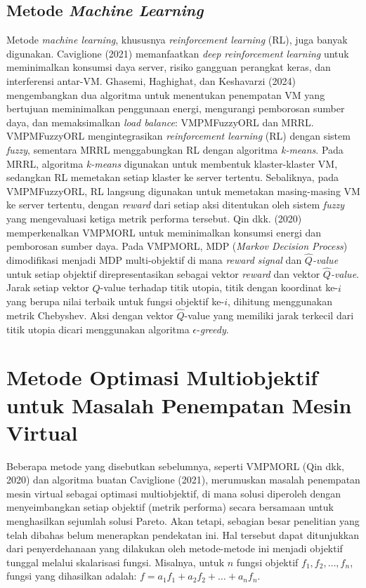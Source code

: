 \subsection{Metode \textit{Machine Learning}}
Metode \textit{machine learning}, khususnya \textit{reinforcement learning} (RL), juga banyak digunakan. Caviglione (2021) memanfaatkan \textit{deep reinforcement learning} untuk meminimalkan konsumsi daya server, risiko gangguan perangkat keras, dan interferensi antar-VM. Ghasemi, Haghighat, dan Keshavarzi (2024) mengembangkan dua algoritma untuk menentukan penempatan VM yang bertujuan meminimalkan penggunaan energi, mengurangi pemborosan sumber daya, dan memaksimalkan \textit{load balance}: VMPMFuzzyORL dan MRRL. VMPMFuzzyORL mengintegrasikan \textit{reinforcement learning} (RL) dengan sistem \textit{fuzzy}, sementara MRRL menggabungkan RL dengan algoritma \textit{k-means}. Pada MRRL, algoritma \textit{k-means} digunakan untuk membentuk klaster-klaster VM, sedangkan RL memetakan setiap klaster ke server tertentu. Sebaliknya, pada VMPMFuzzyORL, RL langsung digunakan untuk memetakan masing-masing VM ke server tertentu, dengan \textit{reward} dari setiap aksi ditentukan oleh sistem \textit{fuzzy} yang mengevaluasi ketiga metrik performa tersebut. Qin dkk. (2020) memperkenalkan VMPMORL untuk meminimalkan konsumsi energi dan pemborosan sumber daya. Pada VMPMORL, MDP (\textit{Markov Decision Process}) dimodifikasi menjadi MDP multi-objektif di mana \textit{reward signal} dan \textit{$\widehat{Q}$-value} untuk setiap objektif direpresentasikan sebagai vektor \textit{reward} dan vektor \textit{$\widehat{Q}$-value}. Jarak setiap vektor $\widehat{Q}$-value terhadap titik utopia, titik dengan koordinat ke-$i$ yang berupa nilai terbaik untuk fungsi objektif ke-$i$, dihitung menggunakan metrik Chebyshev. Aksi dengan vektor $\widehat{Q}$-value yang memiliki jarak terkecil dari titik utopia dicari menggunakan algoritma $\epsilon$-\textit{greedy}. 

\section{Metode Optimasi Multiobjektif untuk Masalah Penempatan Mesin Virtual}
Beberapa metode yang disebutkan sebelumnya, seperti VMPMORL (Qin dkk, 2020) dan algoritma buatan Caviglione (2021), merumuskan masalah penempatan mesin virtual sebagai optimasi multiobjektif, di mana solusi diperoleh dengan menyeimbangkan setiap objektif (metrik performa) secara bersamaan untuk menghasilkan sejumlah solusi Pareto. Akan tetapi, sebagian besar penelitian yang telah dibahas belum menerapkan pendekatan ini. Hal tersebut dapat ditunjukkan dari penyerdehanaan yang dilakukan oleh metode-metode ini menjadi objektif tunggal melalui skalarisasi fungsi. Misalnya, untuk $n$ fungsi objektif $f_1, f_2, \dots, f_n$, fungsi yang dihasilkan adalah: $f = a_1f_1 + a_2f_2 + \dots + a_nf_n$.

